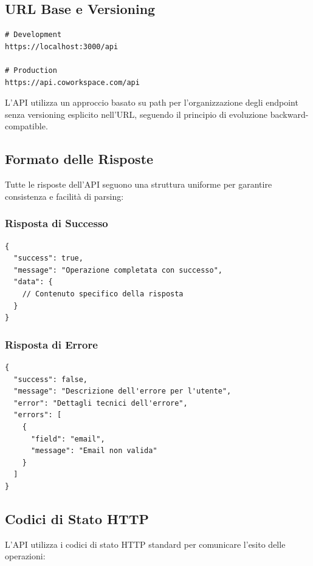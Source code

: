 \subsection{URL Base e Versioning}
\begin{lstlisting}[style=httpstyle, caption=URL Base dell'API]
# Development
https://localhost:3000/api

# Production
https://api.coworkspace.com/api
\end{lstlisting}

L'API utilizza un approccio basato su path per l'organizzazione degli endpoint senza versioning esplicito nell'URL, seguendo il principio di evoluzione backward-compatible.

\subsection{Formato delle Risposte}
Tutte le risposte dell'API seguono una struttura uniforme per garantire consistenza e facilità di parsing:

\subsubsection{Risposta di Successo}
\begin{lstlisting}[caption=Struttura Risposta di Successo]
{
  "success": true,
  "message": "Operazione completata con successo",
  "data": {
    // Contenuto specifico della risposta
  }
}
\end{lstlisting}

\subsubsection{Risposta di Errore}
\begin{lstlisting}[caption=Struttura Risposta di Errore]
{
  "success": false,
  "message": "Descrizione dell'errore per l'utente",
  "error": "Dettagli tecnici dell'errore",
  "errors": [
    {
      "field": "email",
      "message": "Email non valida"
    }
  ]
}
\end{lstlisting}

\subsection{Codici di Stato HTTP}
L'API utilizza i codici di stato HTTP standard per comunicare l'esito delle operazioni:

